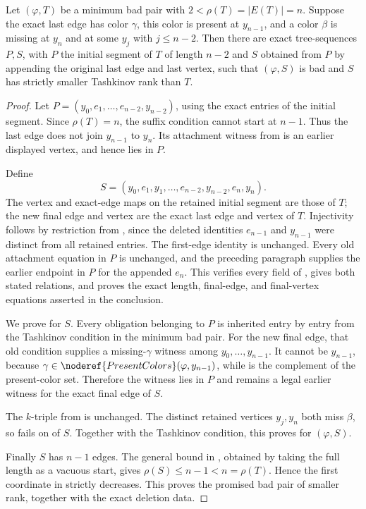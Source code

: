 \begin{helper}
Let \((\varphi,T)\) be a minimum bad pair with
\(2<\rho(T)=|E(T)|=n\).  Suppose the exact last edge has color
\(\gamma\), this color is present at \(y_{n-1}\), and a color \(\beta\)
is missing at \(y_n\) and at some \(y_j\) with \(j\le n-2\).  Then there
are exact tree-sequences \(P,S\), with \(P\) the initial segment of \(T\)
of length \(n-2\) and \(S\) obtained from \(P\) by appending the original
last edge and last vertex, such that \((\varphi,S)\) is bad and
\(S\) has strictly smaller Tashkinov rank than \(T\).
\end{helper}
\begin{proof}
Let \(P=(y_0,e_1,\ldots,e_{n-2},y_{n-2})\), using the exact entries of
the initial segment.  Since \(\rho(T)=n\), the suffix condition cannot
start at \(n-1\).  Thus the last edge does not join \(y_{n-1}\) to
\(y_n\).  Its attachment witness from  is an
earlier displayed vertex, and hence lies in \(P\).

Define
\[
 S=(y_0,e_1,y_1,\ldots,e_{n-2},y_{n-2},e_n,y_n).
\]
The vertex and exact-edge maps on the retained initial segment are those
of \(T\); the new final edge and vertex are the exact last edge and
vertex of \(T\).  Injectivity follows by restriction from
, since the deleted identities \(e_{n-1}\) and
\(y_{n-1}\) were distinct from all retained entries.  The first-edge
identity is unchanged.  Every old attachment equation in \(P\) is
unchanged, and the preceding paragraph supplies the earlier endpoint in
\(P\) for the appended \(e_n\).  This verifies every field of
, gives both stated
 relations, and proves the exact
length, final-edge, and final-vertex equations asserted in the
conclusion.

We prove  for \(S\).  Every obligation belonging
to \(P\) is inherited entry by entry from the Tashkinov condition in the
minimum bad pair.  For the new final edge, that old condition supplies a
missing-\(\gamma\) witness among \(y_0,\ldots,y_{n-1}\).  It cannot be
\(y_{n-1}\), because \(\gamma\in
\noderef{PresentColors}(\varphi,y_{n-1})\), while
 is the complement of the present-color set.
Therefore the witness lies in \(P\) and remains a legal earlier witness
for the exact final edge of \(S\).

The \(k\)-triple from  is unchanged.
The distinct retained vertices \(y_j,y_n\) both miss \(\beta\), so
 fails on
 of \(S\).  Together with the Tashkinov
condition, this proves  for \((\varphi,S)\).

Finally \(S\) has \(n-1\) edges.  The general bound in
, obtained by taking the full length as a
vacuous  start, gives
\(\rho(S)\le n-1<n=\rho(T)\).  Hence the first coordinate in
 strictly decreases.  This proves the promised
bad pair of smaller rank, together with the exact deletion data.
\end{proof}
